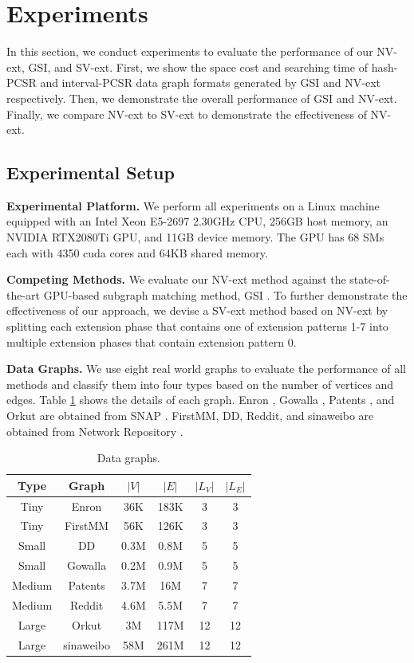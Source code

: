 \section{Experiments}
In this section, we conduct experiments to evaluate the performance of our NV-ext, GSI, and SV-ext. First, we show the space cost and searching time of hash-PCSR and interval-PCSR data graph formats generated by GSI and NV-ext respectively. Then, we demonstrate the overall performance of GSI and NV-ext. Finally, we compare NV-ext to SV-ext to demonstrate the effectiveness of NV-ext.
\subsection{Experimental Setup}
\textbf{Experimental Platform.} We perform all experiments on a Linux machine equipped with an Intel Xeon E5-2697 2.30GHz CPU, 256GB host memory, an NVIDIA RTX2080Ti GPU, and 11GB device memory. The GPU has 68 SMs each with 4350 cuda cores and 64KB shared memory.

\textbf{Competing Methods.} We evaluate our NV-ext method against the state-of-the-art GPU-based subgraph matching method, GSI \cite{zeng2020gsi}. To further demonstrate the effectiveness of our approach, we devise a SV-ext method based on NV-ext by splitting each extension phase that contains one of extension patterns 1-7 into multiple extension phases that contain extension pattern 0.

\textbf{Data Graphs.} We use eight real world graphs to evaluate the performance of all methods and classify them into four types based on the number of vertices and edges. Table \ref{tab:datagraph} shows the details of each graph. Enron \cite{leskovec2009community}, Gowalla \cite{cho2011friendship}, Patents \cite{leskovec2005graphs}, and Orkut \cite{yang2015defining} are obtained from SNAP \cite{snapnets}. FirstMM, DD, Reddit, and sinaweibo are obtained from Network Repository \cite{ryan2015network,nr-sigkdd16}.

\begin{table}
\centering
  \caption{Data graphs.}
  \label{tab:datagraph}
  \begin{tabular}{cccccc}
  \hline
    Type&Graph &$|V|$&$|E|$&$|L_V|$&$|L_E|$\\
    \hline
    Tiny	&Enron		&36K	&183K	&3	&3 \\
    Tiny	&FirstMM 	&56K	&126K	&3	&3 \\
    Small	&DD			&0.3M	&0.8M	&5	&5\\
    Small	&Gowalla	&0.2M	&0.9M	&5	&5\\
    Medium	&Patents	&3.7M	&16M	&7	&7\\
    Medium	&Reddit		&4.6M	&5.5M	&7	&7\\
    Large	&Orkut		&3M		&117M	&12	&12\\
	Large	&sinaweibo	&58M	&261M	&12	&12\\

    \hline
  \end{tabular}
\end{table}

